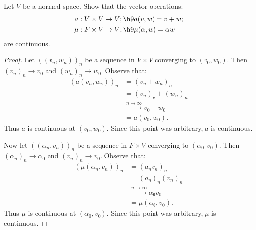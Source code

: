 \documentclass[11pt,twoside,openany]{memoir}
\begin{document}
    \begin{exercise}
        Let $V$ be a normed space. Show that the vector operations:
            \begin{equation*}
            \begin{split}
                a:V \times V &\rightarrow V; \h9 a(v,w) = v + w; \\
                \mu:F \times V &\rightarrow V; \h9 \mu(\alpha,w) = \alpha w
            \end{split}
            \end{equation*}
        are continuous.
    \end{exercise}
        {\color{red} \begin{proof}
            Let $((v_n,w_n))_n$ be a sequence in $V \times V$ converging to $(v_0,w_0) $. Then $(v_n)_n \rightarrow v_0$ and $(w_n)_n \rightarrow w_0$. Observe that:
                \begin{equation*}
                \begin{split}
                    (a(v_n,w_n))_n 
                    & = (v_n + w_n)_n \\
                    & = (v_n)_n + (w_n)_n \\
                    & \xrightarrow{n\rightarrow \infty} v_0 + w_0 \\
                    & = a(v_0,w_0).
                \end{split}
                \end{equation*}
            Thus $a$ is continuous at $(v_0,w_0)$. Since this point was arbitrary, $a$ is continuous.

            Now let $((\alpha_n,v_n))_n$ be a sequence in $F \times V$ converging to $(\alpha_0,v_0)$. Then $(\alpha_n)_n \rightarrow \alpha_0$ and $(v_n)_n \rightarrow v_0$. Observe that:
                \begin{equation*}
                \begin{split}
                    (\mu(\alpha_n,v_n))_n
                    & = (a_n v_n)_n \\
                    & = (a_n)_n (v_n)_n \\
                    & \xrightarrow{n \rightarrow \infty} \alpha_0 v_0 \\
                    & = \mu(\alpha_0,v_0).
                \end{split}
                \end{equation*}
            Thus $\mu$ is continuous at $(\alpha_0,v_0)$. Since this point was arbitrary, $\mu$ is continuous.
        \end{proof}}
\end{document}
